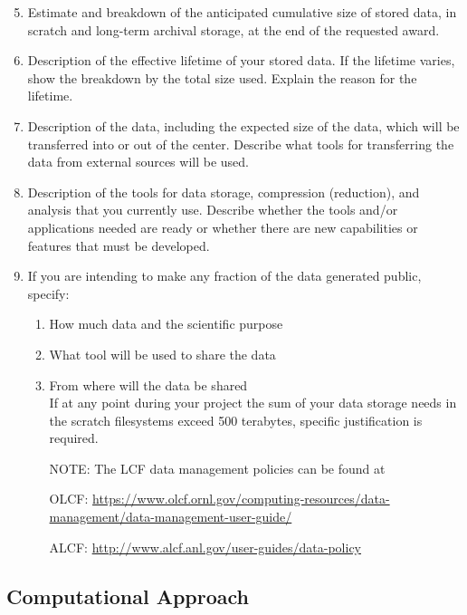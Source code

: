 \documentclass[11pt,letterpaper,english]{article}
\begin{document}
\begin{enumerate}[noitemsep,topsep=0pt]
\setcounter{enumi}{4}
\item Estimate and breakdown of the anticipated cumulative size of stored data, in scratch and long-term archival storage, at the end of the requested award. 
\item Description of the effective lifetime of your stored data.  If the lifetime varies, show the breakdown by the total size used.  Explain the reason for the lifetime.
\item Description of the data, including the expected size of the data, which will be transferred into or out of the center.  Describe what tools for transferring the data from external sources will be used.
\item Description of the tools for data storage, compression (reduction), and analysis that you currently use. Describe whether the tools and/or applications needed are ready or whether there are new capabilities or features that must be developed.
\item If you are intending to make any fraction of the data generated public, specify:
\begin{enumerate}[noitemsep,topsep=0pt]
\item How much data and the scientific purpose
\item What tool will be used to share the data
\item From where will the data be shared\\
\vspace{.1in}
If at any point during your project the sum of your data storage needs in the scratch filesystems exceed 500 terabytes, specific justification is required. 

NOTE: The LCF data management policies can be found at

OLCF:  {\href{https://www.olcf.ornl.gov/computing-resources/data-management/data-management-user-guide/}{https://www.olcf.ornl.gov/computing-resources/data-management/data-management-user-guide/}}

ALCF:  {\href{http://www.alcf.anl.gov/user-guides/data-policy}{http://www.alcf.anl.gov/user-guides/data-policy}}
\end{enumerate}
\end{enumerate}

\vspace{-.25in}
\subsection{Computational Approach}
\vspace{-.2in}
\end{document}
